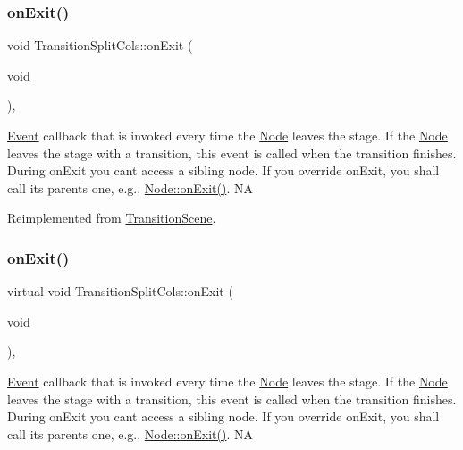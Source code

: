 \subsubsection{\texorpdfstring{on\+Exit()}{onExit()}\hspace{0.1cm}{\footnotesize\ttfamily [1/2]}}
{\footnotesize\ttfamily void Transition\+Split\+Cols\+::on\+Exit (\begin{DoxyParamCaption}\item[{void}]{ }\end{DoxyParamCaption})\hspace{0.3cm}{\ttfamily [override]}, {\ttfamily [virtual]}}

\hyperlink{classEvent}{Event} callback that is invoked every time the \hyperlink{classNode}{Node} leaves the \textquotesingle{}stage\textquotesingle{}. If the \hyperlink{classNode}{Node} leaves the \textquotesingle{}stage\textquotesingle{} with a transition, this event is called when the transition finishes. During on\+Exit you can\textquotesingle{}t access a sibling node. If you override on\+Exit, you shall call its parent\textquotesingle{}s one, e.\+g., \hyperlink{classNode_ac83de835ea315e3179d4293acd8903ac}{Node\+::on\+Exit()}.  NA 

Reimplemented from \hyperlink{classTransitionScene_a45e39b658189c79428a05c3bc3173bbb}{Transition\+Scene}.

\mbox{\label{classTransitionSplitCols_aaf1b4e4345002bda3404ae89e10d5fe1}} 
\subsubsection{\texorpdfstring{on\+Exit()}{onExit()}\hspace{0.1cm}{\footnotesize\ttfamily [2/2]}}
{\footnotesize\ttfamily virtual void Transition\+Split\+Cols\+::on\+Exit (\begin{DoxyParamCaption}\item[{void}]{ }\end{DoxyParamCaption})\hspace{0.3cm}{\ttfamily [override]}, {\ttfamily [virtual]}}

\hyperlink{classEvent}{Event} callback that is invoked every time the \hyperlink{classNode}{Node} leaves the \textquotesingle{}stage\textquotesingle{}. If the \hyperlink{classNode}{Node} leaves the \textquotesingle{}stage\textquotesingle{} with a transition, this event is called when the transition finishes. During on\+Exit you can\textquotesingle{}t access a sibling node. If you override on\+Exit, you shall call its parent\textquotesingle{}s one, e.\+g., \hyperlink{classNode_ac83de835ea315e3179d4293acd8903ac}{Node\+::on\+Exit()}.  NA 

